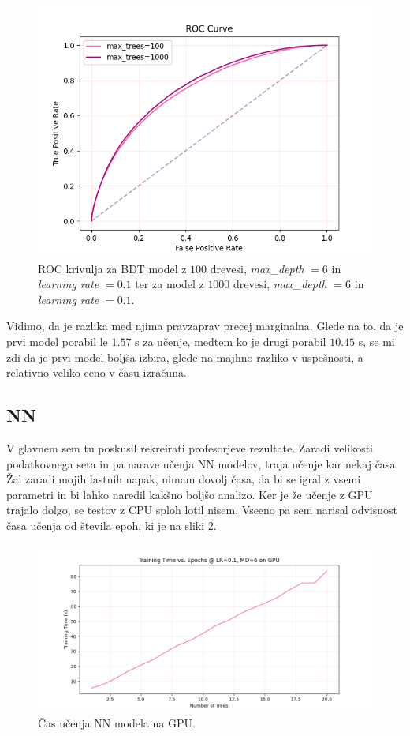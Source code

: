 \documentclass[a4paper]{article}
\begin{document}
\begin{figure}[H]
    \centering
    \includegraphics[width=1\textwidth]{../images/catboost_roc.png}
    \caption{ROC krivulja za BDT model z $100$ drevesi, \textit{max\_depth} $= 6$ in \textit{learning rate} $= 0.1$ ter za 
    model z $1000$ drevesi, \textit{max\_depth} $= 6$ in \textit{learning rate} $= 0.1$.}
    \label{fig:BDT_ROC}
\end{figure}

Vidimo, da je razlika med njima pravzaprav precej marginalna. Glede na to, da je prvi model porabil le $1.57$ s za učenje,
medtem ko je drugi porabil $10.45$ s, se mi zdi da je prvi model boljša izbira, glede na majhno razliko v uspešnosti, a relativno 
veliko ceno v času izračuna.
\subsection{NN}
V glavnem sem tu poskusil rekreirati profesorjeve rezultate. Zaradi velikosti podatkovnega seta in pa narave 
učenja NN modelov, traja učenje kar nekaj časa. Žal zaradi mojih lastnih napak, nimam dovolj časa, da bi se 
igral z vsemi parametri in bi lahko naredil kakšno boljšo analizo. Ker je že učenje z GPU trajalo dolgo, 
se testov z CPU sploh lotil nisem. Vseeno pa sem narisal odvisnost časa učenja od števila epoh, ki je na sliki
\ref{fig:NN_times}. \\

\begin{figure}[H]
    \centering
    \includegraphics[width=1\textwidth]{../images/NNraw_performance.png}
    \caption{Čas učenja NN modela na GPU.}
    \label{fig:NN_times}
\end{figure}
\end{document}
